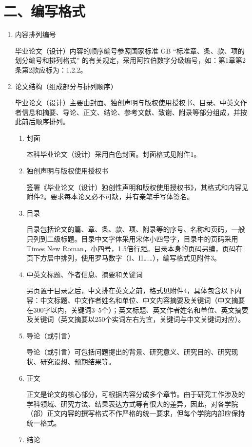 \section*{二、编写格式}
\begin{enumerate}
\item 内容排列编号

毕业论文（设计）内容的顺序编号参照国家标准 GB ``标准章、条、款、项的划分编号和排列格式'' 的有关规定，采用阿拉伯数字分级编号，如：第1章第2条第2款应标为：1.2.2。

\item 论文结构（组成部分与排列顺序）

毕业论文（设计）主要由封面、独创声明与版权使用授权书、目录、中英文作者信息和摘要、导论、正文、结论、参考文献、致谢、附录等部分组成，并按此前后顺序排列。

\begin{enumerate}[label=(\arabic*)]
  \item 封面

  本科毕业论文（设计）采用白色封面。封面格式见附件1。
  \item 独创声明与版权使用授权书

  签署《毕业论文（设计）独创性声明和版权使用授权书》，其格式和内容见附件2。要求每本论文必不可缺，并有亲笔手写体签名。
  \item 目录

  目录包括论文的篇、章、条、款、项、附录等的序号、名称和页码，一般只列到二级标题。目录中文字体采用宋体小四号字，目录中的页码采用Times New Roman，小四号，1.5倍行距。目录本身的页码另编，页码在页下方居中排列，使用罗马数字（I、II……），编写格式见附件3。
  \item 中英文标题、作者信息、摘要和关键词

  另页置于目录之后，中文排在英文之前，格式见附件4，具体包含以下内容：中文标题、中文作者姓名和单位、中文内容摘要及关键词（中文摘要在300字以内，关键词3--5个）；英文标题、英文作者姓名和单位、英文摘要及关键词（英文摘要以250个实词左右为宜，关键词与中文关键词对应）。
  \item 导论（或引言）

  导论（或引言）可包括问题提出的背景、研究意义、研究目的、研究现状、研究设想、预期结果等。
  \item 正文

  正文是论文的核心部分，可根据内容分成多个章节。由于研究工作涉及的学科领域、研究方法、结果表达方式等有很大的差异，因此，对各学院（部）正文内容的撰写格式不作严格的统一要求，但每个学院内部应保持统一格式。
  \item 结论


\end{enumerate}
\end{enumerate}
